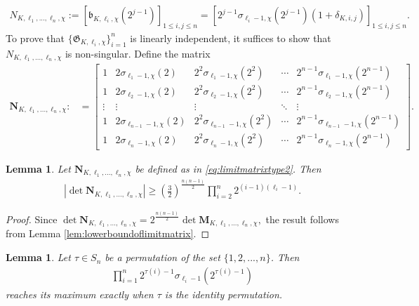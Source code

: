 \documentclass[11pt,letterpaper,reqno]{amsart}
\numberwithin{figure}{section}
\numberwithin{table}{section}
\theoremstyle{definition}
\theoremstyle{plain}
\newtheorem{lemma}[theorem]{Lemma}
\theoremstyle{definition}
\theoremstyle{definition}
\theoremstyle{remark}
\numberwithin{equation}{section}
\theoremstyle{remark}
\begin{document}
\begin{align}
    N_{K,\ell_1,...,\ell_n,\chi}:=\left[\mathfrak{b}_{K,\ell_i,\chi}(2^{j-1})\right]_{1\leq i,j\leq n}=\left[2^{j-1}\sigma_{\ell_i-1,\chi}(2^{j-1})(1+\delta_{K,i,j})\right]_{1\leq i,j\leq n}.\label{eq:matrix2}
\end{align}
To prove that $\{\mathfrak{G}_{K,\ell_i,\chi}\}_{i=1}^n$ is linearly independent, it suffices to show that $N_{K,\ell_1,...,\ell_n,\chi}$ is non-singular. Define the matrix
\begin{align}
\mathbf{N}_{K,\ell_1,...,\ell_n,\chi}:&=\begin{bmatrix}
        1 & 2\sigma_{\ell_1-1,\chi}(2) & 2^2\sigma_{\ell_1-1,\chi}(2^2) & \cdots & 2^{n-1}\sigma_{\ell_1-1,\chi}(2^{n-1})\\
        1 &  2\sigma_{\ell_2-1,\chi}(2) &  2^2\sigma_{\ell_2-1,\chi}(2^2) & \cdots &  2^{n-1}\sigma_{\ell_2-1,\chi}(2^{n-1})\\
        \vdots & \vdots & \vdots & \ddots & \vdots\\
        1 & 2\sigma_{\ell_{n-1}-1,\chi}(2) & 2^2\sigma_{\ell_{n-1}-1,\chi}(2^2) & \cdots & 2^{n-1}\sigma_{\ell_{n-1}-1,\chi}(2^{n-1})\\ 
        1 & 2\sigma_{\ell_n-1,\chi}(2) & 2^2\sigma_{\ell_n-1,\chi}(2^2) & \cdots & 2^{n-1}\sigma_{\ell_n-1,\chi}(2^{n-1})
    \end{bmatrix}.\label{eq:limitmatrixtype2}
\end{align}
\begin{lemma}\label{lem:lowerboundoflimitmatrix2}
   Let $\mathbf{N}_{K,\ell_1,...,\ell_n,\chi}$ be defined as in \eqref{eq:limitmatrixtype2}. Then 
   \begin{align*}
\left|\det \mathbf{N}_{K,\ell_1,...,\ell_n,\chi}\right|\geq\left(\frac{3}{2}\right)^{\frac{n(n-1)}{2}}\prod_{i=2}^n2^{(i-1)(\ell_i-1)}.
   \end{align*}
\end{lemma}
\begin{proof}
    Since $
\det\mathbf{N}_{K,\ell_1,...,\ell_n,\chi}=2^{\frac{n(n-1)}{2}}\det\mathbf{M}_{K,\ell_1,...,\ell_n,\chi},
$
the result follows from Lemma \ref{lem:lowerboundoflimitmatrix}.
\end{proof}
\begin{lemma}\label{lem:permutationRankin}
    Let $\tau\in S_n$ be a permutation of the set $\{1,2,...,n\}$. Then
    \begin{align*}
        \prod_{i=1}^n2^{\tau(i)-1}\sigma_{\ell_i-1}(2^{\tau(i)-1})
    \end{align*}
    reaches its maximum exactly when $\tau$ is the identity permutation.
\end{lemma}
\end{document}
